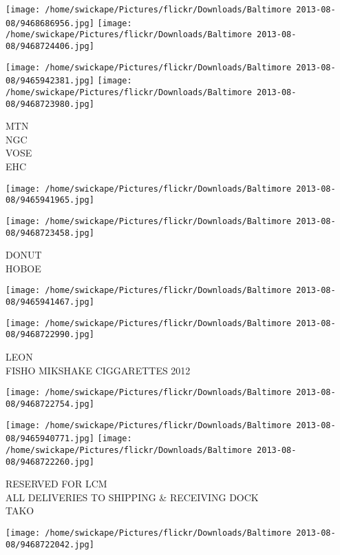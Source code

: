 \documentclass[10pt,letterpaper]{article}
\begin{document}
\texttt{[image: /home/swickape/Pictures/flickr/Downloads/Baltimore 2013-08-08/9468686956.jpg]}
\texttt{[image: /home/swickape/Pictures/flickr/Downloads/Baltimore 2013-08-08/9468724406.jpg]}

\texttt{[image: /home/swickape/Pictures/flickr/Downloads/Baltimore 2013-08-08/9465942381.jpg]}
\texttt{[image: /home/swickape/Pictures/flickr/Downloads/Baltimore 2013-08-08/9468723980.jpg]}

MTN\\
NGC\\
VOSE\\
EHC\\
\pagebreak

\texttt{[image: /home/swickape/Pictures/flickr/Downloads/Baltimore 2013-08-08/9465941965.jpg]}

\vspace{0.25in}
\texttt{[image: /home/swickape/Pictures/flickr/Downloads/Baltimore 2013-08-08/9468723458.jpg]}

DONUT\\
HOBOE\\
\pagebreak

\texttt{[image: /home/swickape/Pictures/flickr/Downloads/Baltimore 2013-08-08/9465941467.jpg]}

\vspace{0.25in}
\texttt{[image: /home/swickape/Pictures/flickr/Downloads/Baltimore 2013-08-08/9468722990.jpg]}

LEON\\
FISHO MIKSHAKE CIGGARETTES 2012\\
\pagebreak

\texttt{[image: /home/swickape/Pictures/flickr/Downloads/Baltimore 2013-08-08/9468722754.jpg]}

\vspace{0.25in}
\texttt{[image: /home/swickape/Pictures/flickr/Downloads/Baltimore 2013-08-08/9465940771.jpg]}
\texttt{[image: /home/swickape/Pictures/flickr/Downloads/Baltimore 2013-08-08/9468722260.jpg]}

RESERVED FOR LCM\\
ALL DELIVERIES TO SHIPPING \& RECEIVING DOCK\\
TAKO\\
\pagebreak

\texttt{[image: /home/swickape/Pictures/flickr/Downloads/Baltimore 2013-08-08/9468722042.jpg]}
\end{document}
